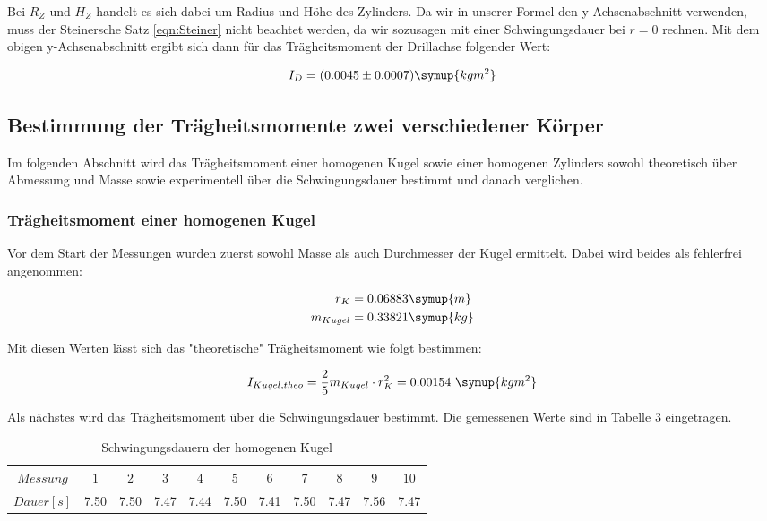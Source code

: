 Bei $R_Z$ und $H_Z$ handelt es sich dabei um Radius und Höhe des Zylinders. Da wir in unserer Formel
den y-Achsenabschnitt verwenden, muss der Steinersche Satz \eqref{eqn:Steiner} nicht beachtet werden, da wir sozusagen
mit einer Schwingungsdauer bei $r=0$ rechnen.
Mit dem obigen y-Achsenabschnitt ergibt sich dann für das Trägheitsmoment der Drillachse folgender Wert:

\begin{equation}
  I_D = (0.0045 \pm 0.0007) \symup{kg m^2}
\end{equation}

\subsection{Bestimmung der Trägheitsmomente zwei verschiedener Körper}
Im folgenden Abschnitt wird das Trägheitsmoment einer homogenen Kugel sowie einer
homogenen Zylinders sowohl theoretisch über Abmessung und Masse sowie experimentell über
die Schwingungsdauer bestimmt und danach verglichen.

\subsubsection{Trägheitsmoment einer homogenen Kugel}
Vor dem Start der Messungen wurden zuerst sowohl Masse als auch Durchmesser der Kugel ermittelt.
Dabei wird beides als fehlerfrei angenommen:

\begin{align}
  r_K &= 0.06883 \symup{m} \\
  m_{Kugel} &= 0.33821 \symup{kg}
\end{align}

Mit diesen Werten lässt sich das "theoretische" Trägheitsmoment wie folgt bestimmen:

\begin{equation}
  I_{Kugel,theo} = \frac{2}{5} m_{Kugel} \cdot r_K^2 = 0.00154 \,\, \symup{kg m^2}
\end{equation}

Als nächstes wird das Trägheitsmoment über die Schwingungsdauer bestimmt. Die gemessenen Werte
sind in Tabelle 3 eingetragen.

\begin{table}
  \centering
  \caption{Schwingungsdauern der homogenen Kugel}
  \begin{tabular}{c c c c c c c c c c c}
    \toprule $Messung$ & $1$ & $2$ & $3$ & $4$ & $5$ & $6$ & $7$ & $8$ & $9$ & $10$ \\
    \midrule $Dauer [s]$ & 7.50 & 7.50 & 7.47 & 7.44 & 7.50 & 7.41 & 7.50 & 7.47 & 7.56 & 7.47\\
    \bottomrule
  \end{tabular}
\end{table}

